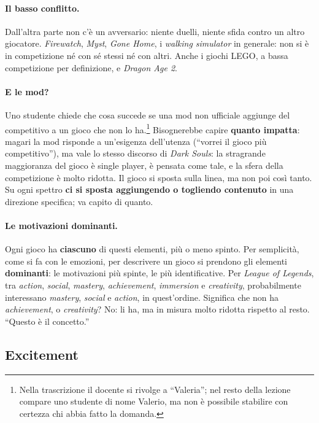 \paragraph{Il basso conflitto.} Dall'altra parte non c'è un avversario: niente
duelli, niente sfida contro un altro giocatore. \emph{Firewatch},
\emph{Myst}, \emph{Gone Home}, i \emph{walking simulator} in generale: non si
è in competizione né con sé stessi né con altri. Anche i giochi LEGO, a
bassa competizione per definizione, e \emph{Dragon Age 2}.

\paragraph{E le mod?} Uno studente chiede che cosa succede se una mod non
ufficiale aggiunge del competitivo a un gioco che non lo ha.\footnote{Nella
trascrizione il docente si rivolge a ``Valeria''; nel resto della lezione
compare uno studente di nome Valerio, ma non è possibile stabilire con
certezza chi abbia fatto la domanda.} Bisognerebbe capire \textbf{quanto
impatta}: magari la mod risponde a un'esigenza dell'utenza (``vorrei il gioco
più competitivo''), ma vale lo stesso discorso di \emph{Dark Souls}: la
stragrande maggioranza del gioco è single player, è pensata come tale, e la
sfera della competizione è molto ridotta. Il gioco si sposta sulla linea, ma
non poi così tanto. Su ogni spettro \textbf{ci si sposta aggiungendo o
togliendo contenuto} in una direzione specifica; va capito di quanto.

\paragraph{Le motivazioni dominanti.} Ogni gioco ha \textbf{ciascuno} di
questi elementi, più o meno spinto. Per semplicità, come si fa con le
emozioni, per descrivere un gioco si prendono gli elementi
\textbf{dominanti}: le motivazioni più spinte, le più identificative. Per
\emph{League of Legends}, tra \emph{action}, \emph{social}, \emph{mastery},
\emph{achievement}, \emph{immersion} e \emph{creativity}, probabilmente
interessano \emph{mastery}, \emph{social} e \emph{action}, in quest'ordine.
Significa che non ha \emph{achievement}, o \emph{creativity}? No: li ha, ma in
misura molto ridotta rispetto al resto. ``Questo è il concetto.''

\subsection{Excitement}

